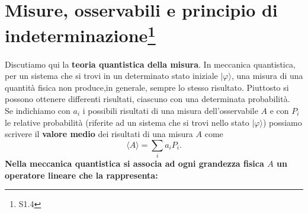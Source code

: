 \chapter[Misure e osservabili]{Misure, osservabili e principio di indeterminazione\footnote{S1.4}}
Discutiamo qui la \textbf{teoria quantistica della misura}. In meccanica quantistica, per un sistema che si trovi in un determinato stato iniziale $\vert \varphi \rangle$, una misura di una quantità fisica non produce,in generale, sempre lo stesso risultato. Piuttosto si possono ottenere differenti risultati, ciascuno con una determinata probabilità.\\
Se indichiamo con $a_i$ i possibili risultati di una misura dell'osservabile $A$ e con $P_i$ le relative probabilità (riferite ad un sistema che si trovi nello stato $\vert \varphi \rangle$) possiamo scrivere il \textbf{valore medio} dei risultati di una misura $A$ come
\begin{equation}
\langle A \rangle = \sum _i a_i P_i.
\end{equation}
\textbf{Nella meccanica quantistica si associa ad ogni grandezza fisica $A$ un operatore lineare che la rappresenta:}

